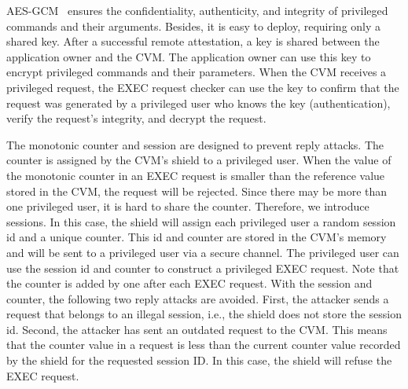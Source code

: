 AES-GCM~\cite*{aes_gcm} ensures the confidentiality, authenticity, and integrity of privileged commands and their arguments. Besides, it is easy to deploy, requiring only a shared key. After a successful remote attestation, a key is shared between the application owner and the \acrshort{CVM}. The application owner can 
use this key to encrypt privileged commands and their parameters. When the \acrshort{CVM} receives a privileged request, the EXEC request checker can use the key to confirm that the request was generated by a privileged user who knows the key (authentication), verify the request's integrity, and decrypt the 
request.


The monotonic counter and session are designed to prevent reply attacks. The counter is assigned by the \acrshort{CVM}'s shield to a privileged user. When the value of the monotonic counter in an EXEC request is smaller than the reference value stored in the \acrshort{CVM}, the request will be rejected. Since there may be 
more than one privileged user, it is hard to share the counter. Therefore, we introduce sessions. In this case, the shield will assign each privileged user a random session id and a unique counter. This id and counter are stored in the \acrshort{CVM}'s memory and will be sent to a privileged user via a secure channel. 
The privileged user can use the session id and counter to construct a privileged EXEC request. Note that the counter is added by one after each EXEC request. With the session and counter, the following two reply attacks are avoided. First, the attacker sends a request that belongs to an illegal session, 
i.e., the shield does not store the session id. Second, the attacker has sent an outdated request to the \acrshort{CVM}. This means that the counter value in a request is less than the current counter value recorded by the shield for the requested session ID. In this case, the shield will refuse the EXEC request.

